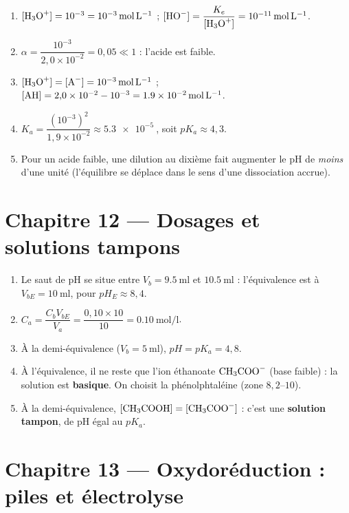 \begin{enumerate}[label=\arabic*)]
\item $[\ce{H3O+}] = 10^{-3} = \SI{e-3}{\mol\per\litre}$ ;
$[\ce{HO-}] = \dfrac{K_e}{[\ce{H3O+}]} = \SI{e-11}{\mol\per\litre}$.
\item $\alpha = \dfrac{10^{-3}}{2{,}0\times10^{-2}} = 0{,}05 \ll 1$ : l'acide est faible.
\item $[\ce{H3O+}] = [\ce{A-}] = \SI{e-3}{\mol\per\litre}$ ;
$[\ce{AH}] = 2{,}0\times10^{-2} - 10^{-3} = \SI{1.9e-2}{\mol\per\litre}$.
\item $K_a = \dfrac{(10^{-3})^2}{1{,}9\times10^{-2}} \approx \SI{5.3e-5}{}$, soit $pK_a \approx 4{,}3$.
\item Pour un acide faible, une dilution au dixième fait augmenter le pH de
\emph{moins} d'une unité (l'équilibre se déplace dans le sens d'une dissociation accrue).
\end{enumerate}

\section{Chapitre 12 — Dosages et solutions tampons}

\begin{enumerate}[label=\arabic*)]
\item Le saut de pH se situe entre $V_b = \SI{9.5}{\milli\litre}$ et
$\SI{10.5}{\milli\litre}$ : l'équivalence est à $V_{bE} = \SI{10}{\milli\litre}$,
pour $pH_E \approx 8{,}4$.
\item $C_a = \dfrac{C_b V_{bE}}{V_a} = \dfrac{0{,}10\times10}{10} = \SI{0.10}{\mol\per\litre}$.
\item À la demi-équivalence ($V_b = \SI{5}{\milli\litre}$), $pH = pK_a = 4{,}8$.
\item À l'équivalence, il ne reste que l'ion éthanoate $\ce{CH3COO-}$ (base faible) :
la solution est \textbf{basique}. On choisit la phénolphtaléine (zone $8{,}2$–$10$).
\item À la demi-équivalence, $[\ce{CH3COOH}] = [\ce{CH3COO-}]$ : c'est une
\textbf{solution tampon}, de pH égal au $pK_a$.
\end{enumerate}

\section{Chapitre 13 — Oxydoréduction : piles et électrolyse}


